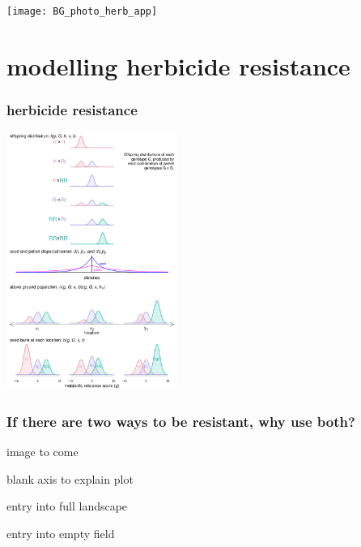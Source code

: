 \documentclass[]{beamer}
\begin{document}
\begin{frame}
	\texttt{[image: BG\_photo\_herb\_app]}
\end{frame}

\section{modelling herbicide resistance}
\begin{frame}
	\frametitle{herbicide resistance}
	\begin{center}
		\includegraphics[width=2.2in]{BG_pop_spatial_mod_schematic.pdf}\\
	\end{center} 
\end{frame}

\begin{frame}
	\frametitle{If there are two ways to be resistant, why use both?}
	image to come
	
	blank axis to explain plot
	
	entry into full landscape
	
	entry into empty field
	
\end{frame}
\end{document}
